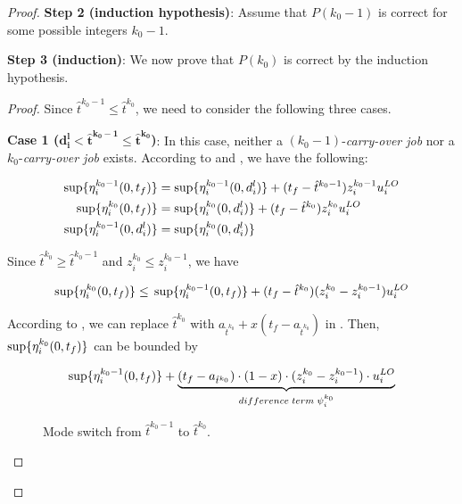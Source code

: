 \documentclass[10pt,journal,compsoc]{IEEEtran}
\begin{document}
\begin{proof}
\noindent\textbf{Step 2 (induction hypothesis)}: Assume that $P(k_0-1)$ is correct for some possible integers $k_0-1$.

\noindent\textbf{Step 3 (induction)}: We now prove that $P(k_0)$ is correct by the induction hypothesis.

\begin{proof}
Since $\hat{t}^{k_0-1}\le{}\hat{t}^{k_0}$, we need to consider the following three cases.

\textbf{Case 1 ($\mathbf{d_i^{l}<\hat{t}^{k_0-1}\le{}\hat{t}^{k_0}}$)}: In this case, neither a $(k_0-1)$-\textit{carry-over job} nor a $k_0$-\textit{carry-over job} exists.  
According to  and , we have the following:
\begin{small}
\begin{align*}
\sup\{\eta_i^{k_0-1}(0,t_f)\}&=\sup\{\eta_i^{k_0-1}(0,d_i^{l})\}+(t_f-\hat{t}^{k_0-1})z_i^{k_0-1}u_i^{LO} \\
\sup\{\eta_i^{k_0}(0,t_f)\}&=\sup\{\eta_i^{k_0}(0,d_i^{l})\}+(t_f-\hat{t}^{k_0})z_i^{k_0}u_i^{LO} \\
\sup\{\eta_i^{k_0-1}(0,d_i^{l})\}&=\sup\{\eta_i^{k_0}(0,d_i^{l})\}
\end{align*} 
\end{small}

Since $\hat{t}^{k_0}\ge{}\hat{t}^{k_0-1}$ and $z_i^{k_0}\le{}z_i^{k_0-1}$, we have
\begin{small}
\begin{align}
\sup\{\eta_i^{k_0}(0,t_f)\}\le{}\sup\{\eta_i^{k_0-1}(0,t_f)\}+(t_f-\hat{t}^{k_0}){(z_i^{k_0}-z_i^{k_0-1})}{u_i^{LO}}
\label{eq:lem1:2}
\end{align} 
\end{small}
According to , we can replace $\hat{t}^{k_0}$ with $a_{\hat{t}^{k_0}}+x{(t_f-a_{\hat{t}^{k_0}})}$ in . Then, $\sup\{\eta_i^{k_0}(0,t_f)\}$ can be bounded by
\begin{small}
\begin{align*}
\sup\{\eta_i^{k_0-1}(0,t_f)\}+\underbrace{(t_f-a_{\hat{t}^{k_0}})\cdot(1-x)\cdot{(z_i^{k_0}-z_i^{k_0-1})}\cdot{u_i^{LO}}}_{difference\;term\;\psi_i^{k_0}}
\end{align*} 
\end{small} 

\begin{figure}
\centering
  \caption{Mode switch from $\hat{t}^{k_0-1}$ to $\hat{t}^{k_0}$.}
  \label{fig:timing}
	\vspace{-0.75cm}
\end{figure}


\end{proof}
\end{proof}
\end{document}
